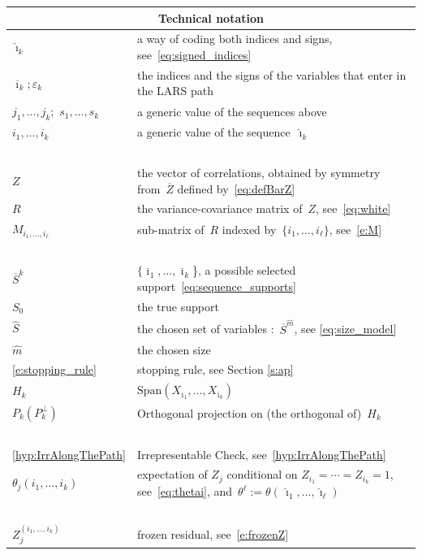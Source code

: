 \documentclass[final,numbib]{imaiai}%
\numberwithin{equation}{section}
\renewcommand{\bar}{\overline}
\renewcommand{\hat}{\widehat}
\def\\bUnif{\text{\bUnif}}
\newcommand{\<}{\langle}
\renewcommand{\>}{\rangle}
\newcommand{\1}{\mathds{1}}
\begin{document}
{{\begin{center}
	{\small
	\begin{tabular}{ll}
		\multicolumn{2}{c}{Technical notation} \\
		\midrule
		$ \hat \imath_k~$
		&  a way of coding both indices and signs, see~\eqref{eq:signed_indices} \\
		$ \bar \imath_k ; \varepsilon_k$
		& the indices and the signs of  the variables that enter in the LARS path \\
		$j_1,\ldots,j_k$;~$s_1,\ldots,s_k~$ 
		& a generic  value of the sequences above \\
		$i_1,\ldots,i_k$ 
		& a generic  value of the sequence~$ \hat \imath_k~$\\
		{\ } & {\ }\\
		$Z$ 
		& the vector of correlations, obtained by symmetry from~$\bar{Z}$ defined by~\eqref{eq:defBarZ}\\
		$R$ 
		& the variance-covariance matrix of~$Z$, see~\eqref{eq:white} \\
		$M_{i_1,\ldots, i_{\ell}}$
		&  sub-matrix of~$R$ indexed by~$\{i_1,\ldots, i_{\ell}\}$, see~\eqref{e:M}\\
		{\ } & {\ }\\
		$  \bar S^k$ 
		& $\{ \bar \imath_1,\ldots, \bar \imath_k$\}, a possible selected support~\eqref{eq:sequence_supports} \\
		$S_0$
		& the true support\\
		$\hat {S}$
		& the chosen set of variables :~$\bar S ^{\hat m}$, see \eqref{eq:size_model}\\
		$\hat m$  
		& the chosen size \\
		\eqref{e:stopping_rule}
		& stopping rule, see Section \ref{s:ap}\\
		$ H_k$
		&$ \mathrm{Span}(X_{\bar \imath_1},\ldots,X_{\bar \imath_k})$\\
		$P_k (P_k^\perp)$ 
		& Orthogonal projection on (the orthogonal of)~$H_k$\\
		{\ } & {\ }\\
		\eqref{hyp:IrrAlongThePath} 
		&  Irrepresentable Check, see~\eqref{hyp:IrrAlongThePath}\\
		$\theta_j(i_1, \ldots,i_k)~$  
		& expectation of $Z_j$ conditional on $Z_{i_1}=\cdots=Z_{i_k}=1$, see~\eqref{eq:thetai}, and~$\theta^{\ell}:=\theta(\,\hat \imath _1, \ldots, \hat \imath _\ell)$\\
		{\ } & {\ }\\
		$Z^{(i_1,\ldots, i_{k})}_j$
		& frozen residual, see~\eqref{e:frozenZ}\\

\end{tabular}}
\end{center}}}
\end{document}
